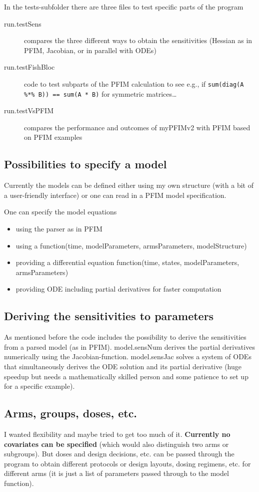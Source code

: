 In the tests-subfolder there are three files to test specific parts of the program
\begin{description}
\item[run.testSens] compares the three different ways to obtain the sensitivities (Hessian as in PFIM, Jacobian, or in parallel with ODEs)
\item[run.testFishBloc] code to test subparts of the PFIM calculation to see e.g., if  \verb!sum(diag(A %*% B)) == sum(A * B)! for symmetric matrices\dots
\item[run.testVsPFIM] compares the performance and outcomes of myPFIMv2 with PFIM based on PFIM examples
\end{description}

\subsection{Possibilities to specify a model}
Currently the models can be defined either using my own structure (with a bit of a user-friendly interface) or one can read in a PFIM model specification.

One can specify the model equations
\begin{itemize}
\item using the parser as in PFIM
\item using a function(time, modelParameters, armsParameters, modelStructure)
\item providing a differential equation function(time, states, modelParameters, armsParameters)
\item providing ODE including partial derivatives for faster computation
\end{itemize}

\subsection{Deriving the sensitivities to parameters}
As mentioned before
the code includes the possibility to derive the sensitivities from a parsed model (as in PFIM).
model.sensNum derives the partial derivatives numerically using the Jacobian-function.
model.sensJac solves a system of ODEs that simultaneously derives the ODE solution and its partial derivative (huge speedup but needs a mathematically skilled person and some patience to set up for a specific example).

\subsection{Arms, groups, doses, etc.}
I wanted flexibility and maybe tried to get too much of it.
{\bf Currently no covariates can be specified} (which would also distinguish two arms or subgroups).
But doses and design decisions, etc. can be passed through the program to obtain different protocols or design layouts, dosing regimens, etc. for different arms (it is just a list of parameters passed through to the model function).

